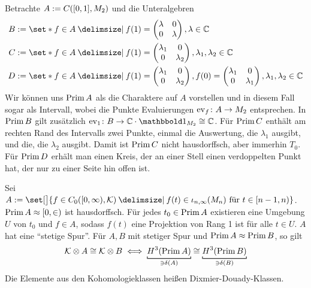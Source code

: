 \begin{beispiel}[{name=[{Wege in $2 \times 2$-Matrizen}]}]
	Betrachte $A := C\enbrace*{[0,1],M_2}$ und die Unteralgebren 
	\begin{align}
		B &:= \set*{f \in A \given f(1) = \begin{pmatrix} \lambda & 0\\ 0 & \lambda \end{pmatrix}, \lambda \in \mathbb{C}}\\
		C &:= \set*{f \in A \given f(1) = \begin{pmatrix} \lambda_1 & 0\\ 0 & \lambda_2 \end{pmatrix}, \lambda_1, \lambda_2 \in \mathbb{C}} \\
		D &:= \set*{f \in A \given f(1)= \begin{pmatrix} \lambda_1 & 0\\ 0 & \lambda_2 \end{pmatrix}, f(0)= \begin{pmatrix} \lambda_1 & 0\\ 0 & \lambda_1 \end{pmatrix}, \lambda_1, \lambda_2 \in \mathbb{C}}
	\end{align}
	Wir können uns $\operatorname{Prim} A$ als die Charaktere auf $A$ vorstellen und in diesem Fall sogar als Intervall, wobei die Punkte Evaluierungen $\operatorname{ev}_f \colon A \to M_2$ entsprechen.
	In $\operatorname{Prim} B$ gilt zusätzlich $\ev_1 \colon B \to \mathbb{C} \cdot \ind_{M_2} \cong \mathbb{C}$.
	Für $\operatorname{Prim} C$ enthält am rechten Rand des Intervalls zwei Punkte, einmal die Auswertung, die $\lambda_1$ ausgibt, und die, die $\lambda_2$ ausgibt.
	Damit ist $\operatorname{Prim} C$ nicht hausdorffsch, aber immerhin $T_0$.
	Für $\operatorname{Prim} D$ erhält man einen Kreis, der an einer Stell einen verdoppelten Punkt hat, der nur zu einer Seite hin offen ist.
\end{beispiel}

\begin{beispiel}
	Sei $A := \set[\big]{f \in C_0\enbrace*{[0,\infty),\mathcal{K}} \given f(t) \in \iota_{n,\infty}(M_n) \text{ für }t \in [n-1,n)}$.
	$\operatorname{Prim} A \approx [0,\in )$ ist hausdorffsch.
	Für jedes $t_0 \in \operatorname{Prim} A$ existieren eine Umgebung $U$ von $t_0$ und $f \in A$, sodass $f(t)$ eine Projektion von Rang 1 ist für alle $t \in U$.
	$A$ hat eine \enquote{stetige Spur}.
	Für $A,B$ mit stetiger Spur und $\operatorname{Prim} A \approx \operatorname{Prim} B$, so gilt 
	\[
		\mathcal{K} \otimes A \cong \mathcal{K} \otimes B \iff \Underbracket{H^3(\Prim A)}{\ni \delta(A)}\cong \Underbracket{H^3(\Prim B)}{\ni\delta(B)} 
	\]
	Die Elemente aus den Kohomologieklassen heißen Dixmier-Douady-Klassen.
\end{beispiel}

